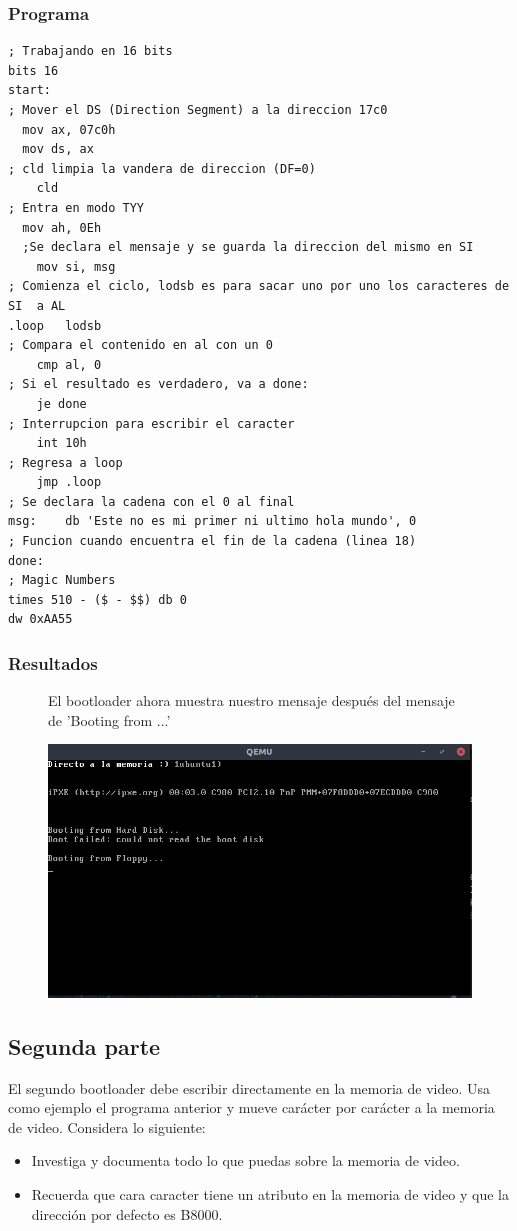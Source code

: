 \documentclass[12pt]{article}
\begin{document}
\subsubsection{Programa}
\begin{verbatim}
; Trabajando en 16 bits
bits 16
start:
; Mover el DS (Direction Segment) a la direccion 17c0
  mov ax, 07c0h
  mov ds, ax
; cld limpia la vandera de direccion (DF=0)
	cld
; Entra en modo TYY
  mov ah, 0Eh
  ;Se declara el mensaje y se guarda la direccion del mismo en SI
	mov si, msg
; Comienza el ciclo, lodsb es para sacar uno por uno los caracteres de SI  a AL
.loop	lodsb
; Compara el contenido en al con un 0
	cmp al, 0
; Si el resultado es verdadero, va a done:
	je done
; Interrupcion para escribir el caracter
	int 10h
; Regresa a loop
	jmp .loop 
; Se declara la cadena con el 0 al final
msg:	db 'Este no es mi primer ni ultimo hola mundo', 0
; Funcion cuando encuentra el fin de la cadena (linea 18)
done:
; Magic Numbers
times 510 - ($ - $$) db 0
dw 0xAA55
\end{verbatim}
\subsubsection{Resultados}
\begin{figure}[!htb]
\begin{minipage}{0.5\textwidth}
El bootloader ahora muestra nuestro mensaje después del mensaje de 'Booting from ...'
\end{minipage}
\begin{minipage}{0.5\textwidth}
\includegraphics{ParteDos.png}
\end{minipage}
\end{figure}
\subsection{Segunda parte}
El segundo bootloader debe escribir directamente en la memoria de video. Usa como ejemplo el programa anterior y mueve carácter por carácter a la memoria de video. Considera lo siguiente:
\begin{itemize}
    \item Investiga y documenta todo lo que puedas sobre la memoria de video.
    \item Recuerda que cara caracter tiene un atributo en la memoria de video y que la dirección por defecto es B8000.
\end{itemize}
\end{document}
